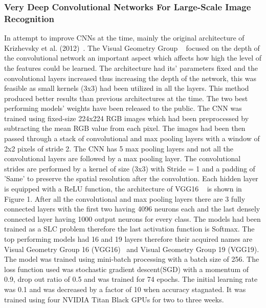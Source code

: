\documentclass{csfyp}
\newcommand\tab[1][1cm]{\hspace*{#1}}
\begin{document}
\subsubsection{Very Deep Convolutional Networks For Large-Scale Image Recognition}
In attempt to improve CNNs at the time, mainly the original architecture of Krizhevsky et al. (2012)~\cite{NIPS2012_4824}. The Visual Geometry Group ~\cite{Simonyan14c} focused on the depth of the convolutional network an important aspect which affects how high the level of the features could be learned. The architecture had its’ parameters fixed and the convolutional layers increased thus increasing the depth of the network, this was feasible as small kernels (3x3) had been utilized in all the layers. This method produced better results than previous architectures at the time. The two best performing models’ weights have been released to the public. The CNN was trained using fixed-size 224x224 RGB images which had been preprocessed by subtracting the mean RGB value from each pixel. The images had been then passed through a stack of convolutional and max pooling layers with a window of 2x2 pixels of stride 2. The CNN has 5 max pooling layers and not all the convolutional layers are followed by a max pooling layer. The convolutional strides are performed by a kernel of size (3x3) with Stride = 1 and a padding of 'Same' to preserve the spatial resolution after the convolution. Each hidden layer is equipped with a ReLU function, the architecture of VGG16 ~\cite{Simonyan14c} is shown in Figure 1. After all the convolutional and max pooling layers there are 3 fully connected layers with the first two having 4096 neurons each and the last densely connected layer having 1000 output neurons for every class. The models had been trained as a SLC problem therefore the last activation function is Softmax. The top performing models had 16 and 19 layers therefore their acquired names are Visual Geometry Group 16 (VGG16)~\cite{Simonyan14c} and Visual Geometry Group 19 (VGG19).
\\
\tab
The model was trained using mini-batch processing with a batch size of 256. The \Gls{loss} function used was stochastic gradient descent(SGD) with a momentum of 0.9, drop out ratio of 0.5 and was trained for 74 \Gls{epoch}s. The initial  learning rate was 0.1 and was decreased by a factor of 10 when accuracy stagnated. It was trained using four NVIDIA Titan Black GPUs for two to three weeks.
\\
\end{document}
